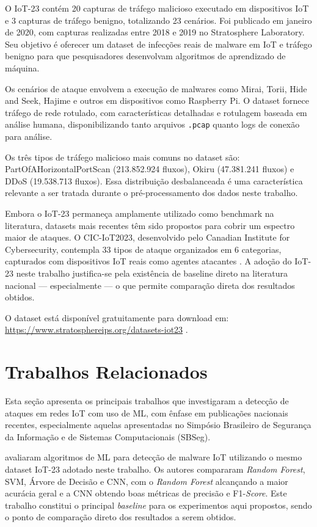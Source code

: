 O IoT-23 contém 20 capturas de tráfego malicioso executado em dispositivos
IoT e 3 capturas de tráfego benigno, totalizando 23 cenários. Foi publicado
em janeiro de 2020, com capturas realizadas entre 2018 e 2019 no Stratosphere
Laboratory. Seu objetivo é oferecer um dataset de infecções reais de malware
em IoT e tráfego benigno para que pesquisadores desenvolvam algoritmos de
aprendizado de máquina.

Os cenários de ataque envolvem a execução de malwares como Mirai, Torii,
Hide and Seek, Hajime e outros em dispositivos como Raspberry Pi. O dataset
fornece tráfego de rede rotulado, com características detalhadas e rotulagem
baseada em análise humana, disponibilizando tanto arquivos \texttt{.pcap}
quanto logs de conexão para análise.

Os três tipos de tráfego malicioso mais comuns no dataset são:
PartOfAHorizontalPortScan (213.852.924 fluxos), Okiru (47.381.241 fluxos)
e DDoS (19.538.713 fluxos). Essa distribuição desbalanceada é uma
característica relevante a ser tratada durante o pré-processamento dos
dados neste trabalho.

Embora o IoT-23 permaneça amplamente utilizado como benchmark na
literatura, datasets mais recentes têm sido propostos para cobrir um
espectro maior de ataques. O CIC-IoT2023, desenvolvido pelo Canadian
Institute for Cybersecurity, contempla 33 tipos de ataque organizados em
6 categorias, capturados com dispositivos IoT reais como agentes atacantes
\citep{Neto2023CICIoT}. A adoção do IoT-23 neste trabalho justifica-se
pela existência de baseline direto na literatura nacional — especialmente
\citep{SouzaArima2024} — o que permite comparação direta dos resultados
obtidos.

O dataset está disponível gratuitamente para download em:
\url{https://www.stratosphereips.org/datasets-iot23}
\citep{IoT23Dataset2020}.

\section{Trabalhos Relacionados}\label{sec:relacionados}

Esta seção apresenta os principais trabalhos que investigaram a detecção de ataques em redes IoT com uso de ML, com ênfase em publicações nacionais recentes, especialmente aquelas apresentadas no Simpósio Brasileiro de Segurança da Informação e de Sistemas Computacionais (SBSeg).

\cite{SouzaArima2024} avaliaram algoritmos de ML para detecção de malware IoT utilizando o mesmo dataset IoT-23 adotado neste trabalho. Os autores compararam \textit{Random Forest}, SVM, Árvore de Decisão e CNN, com o \textit{Random Forest} alcançando a maior acurácia geral e a CNN obtendo boas métricas de precisão e F1-\textit{Score}. Este trabalho constitui o principal \textit{baseline} para os experimentos aqui propostos, sendo o ponto de comparação direto dos resultados a serem obtidos.


